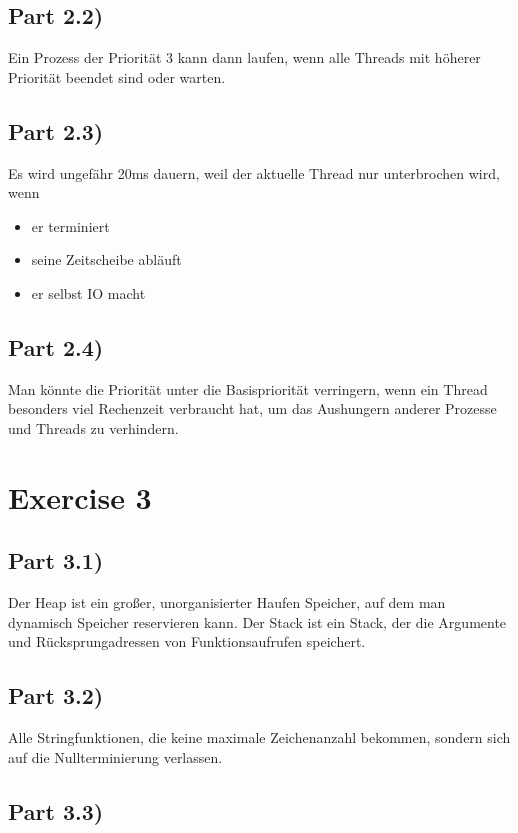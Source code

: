 \documentclass[10pt,a4paper]{article}
\begin{document}
\subsection*{Part 2.2)}

Ein Prozess der Priorität 3 kann dann laufen, wenn alle Threads mit höherer Priorität beendet sind oder warten.

\subsection*{Part 2.3)}

Es wird ungefähr 20ms dauern, weil der aktuelle Thread nur unterbrochen wird, wenn
\begin{itemize}
\item er terminiert
\item seine Zeitscheibe abläuft
\item er selbst IO macht
\end{itemize}

\subsection*{Part 2.4)}

Man könnte die Priorität unter die Basispriorität verringern, wenn ein Thread besonders viel Rechenzeit verbraucht hat, um das Aushungern anderer Prozesse und Threads zu verhindern.

\section*{Exercise 3}

\subsection*{Part 3.1)}

Der Heap ist ein großer, unorganisierter Haufen Speicher, auf dem man dynamisch Speicher reservieren kann.
Der Stack ist ein Stack, der die Argumente und Rücksprungadressen von Funktionsaufrufen speichert.

\subsection*{Part 3.2)}

Alle Stringfunktionen, die keine maximale Zeichenanzahl bekommen, sondern sich auf die Nullterminierung verlassen.

\subsection*{Part 3.3)}
\end{document}
